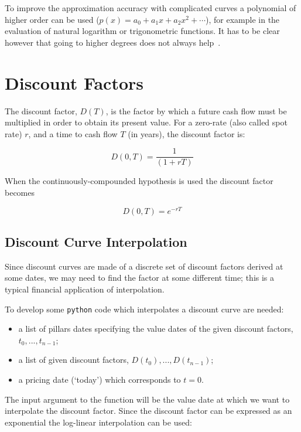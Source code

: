 To improve the approximation accuracy with complicated curves a polynomial of higher order can be used ($𝑝(𝑥)=𝑎_0 + 𝑎_1 𝑥+ 𝑎_2 𝑥^2+\cdots$), for example in the evaluation of natural logarithm or trigonometric functions. It has to be clear however that going to higher degrees does not always help~\cite{bib:runge}.

\section{Discount Factors}
\label{discount-factors}
The discount factor, $D(T)$, is the factor by which a future cash flow must be multiplied in order to obtain its present value. For a zero-rate (also called spot rate) $r$, and a time to cash flow $T$ (in years), the discount factor is:

\begin{equation}
D(0, T)= \frac {1}{(1+rT)}
\label{eq:discount_factor}
\end{equation}

When the continuously-compounded hypothesis is used the discount factor becomes

\begin{equation}
D(0, T)= e^{-rT}
\label{eq:discount_factor_cc}
\end{equation}

\subsection{Discount Curve Interpolation}
\label{discount-curve-interpolation}

Since discount curves are made of a discrete set of discount factors derived at some dates, we may need to find the factor at some different time; this is a typical financial application of interpolation.

To develop some \texttt{python} code which interpolates a discount curve are needed:

\begin{itemize}
\tightlist
\item a list of pillars dates specifying the value dates of the given discount factors, \(t_0,...,t_{n-1}\);
\item a list of given discount factors, \(D(t_0),...,D(t_{n-1})\);
\item a pricing date (`today') which corresponds to \(t=0\).
\end{itemize}

The input argument to the function will be the value date at which we want to interpolate the discount factor. Since the discount factor can be expressed as an exponential the log-linear interpolation can be used:


